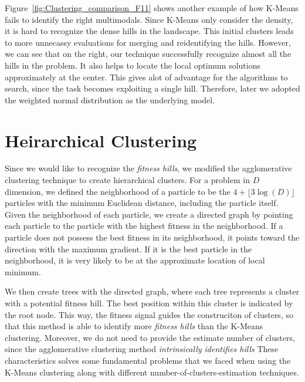 Figure~\ref{fig:Clustering_comparison_F11} shows another example of how K-Means fails to identify the right multimodals.
Since K-Means only consider the density, it is hard to recognize the dense hills in the landscape. 
This initial clusters leads to more unnecassy evaluations for merging and reidentifying the hills.
However, we can see that on the right, our technique successfully recognize almost all the hills in the problem.
It also helps to locate the local optimum solutions approximately at the center.
This gives alot of advantage for the algorithms to search, since the task becomes exploiting a single hill.
Therefore, later we adopted the weighted normal distribution as the underlying model. 


\section{Heirarchical Clustering}\label{section:hierarchical}

Since we would like to recognize the \textit{fitness hills}, 
we modified the agglomerative clustering technique to create hierarchical clusters.
For a problem in $D$ dimension, we defined the neighborhood of a particle 
to be the $ 4 + \lfloor 3\log(D) \rfloor $ particles with the minimum Euclidean distance, including the particle itself.
Given the neighborhood of each particle, 
we create a directed graph by pointing each particle to the particle with the highest fitness in the neighborhood.
If a particle does not possess the best fitness in its neighborhood, it points toward the direction with the maximum gradient.
If it is the best particle in the neighborhood, it is very likely to be at the approximate location of local minimum.

We then create trees with the directed graph, 
where each tree represents a cluster with a potential fitness hill.
The best position within this cluster is indicated by the root node.  
This way, the fitness signal guides the construciton of clusters, 
so that this method is able to identify more \textit{fitness hills} than the K-Means clustering.
Moreover, we do not need to provide the estimate number of clusters, 
since the agglomerative clustering method \textit{intrinsically identifies hills} 
These characteristics solves some fundamental problems that we faced when using the K-Means clustering along with different number-of-clusters-estimation techniques.

